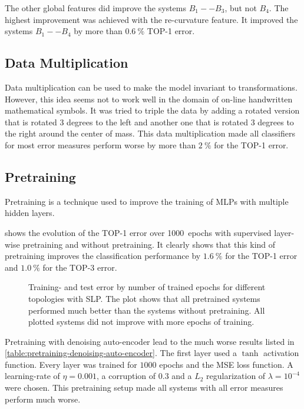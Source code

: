 \documentclass[9pt,technote]{IEEEtran}
\begin{document}
The other global features did improve the systems $B_1 -- B_3$, but not $B_4$.
The highest improvement was achieved with the re-curvature feature. It
improved the systems $B_1 -- B_4$ by more than $\SI{0.6}{\percent}$ TOP-1 error.


\subsection{Data Multiplication}
Data multiplication can be used to make the model invariant to transformations.
However, this idea seems not to work well in the domain of on-line handwritten
mathematical symbols. It was tried to triple the data by adding a rotated
version that is rotated 3 degrees to the left and another one that is rotated
3 degrees to the right around the center of mass. This data multiplication
made all classifiers for most error measures perform worse by more than
$\SI{2}{\percent}$ for the TOP-1 error.

\subsection{Pretraining}\label{subsec:pretraining-evaluation}
Pretraining is a technique used to improve the training of \glspl{MLP} with
multiple hidden layers.

 shows
the evolution of the TOP-1 error over 1000~epochs with supervised
layer-wise pretraining and without pretraining. It clearly shows that this
kind of pretraining improves the classification performance by $\SI{1.6}{\percent}$
for the TOP-1 error and $\SI{1.0}{\percent}$ for the TOP-3 error.

\begin{figure}[htb]
    \centering
    
    \caption{Training- and test error by number of trained epochs for different
             topologies with \gls{SLP}. The plot shows
             that all pretrained systems performed much better than the systems
             without pretraining. All plotted systems did not improve
             with more epochs of training.}
\label{fig:training-and-test-error-for-different-topologies-pretraining}
\end{figure}

Pretraining with denoising auto-encoder lead to the much worse results listed in
\cref{table:pretraining-denoising-auto-encoder}. The first layer used a $\tanh$
activation function. Every layer was trained for $1000$ epochs and the 
\gls{MSE} loss function. A learning-rate of $\eta = 0.001$, a corruption of
$0.3$ and a $L_2$ regularization of $\lambda = 10^{-4}$ were chosen. This
pretraining setup made all systems with all error measures perform much worse.
\end{document}
